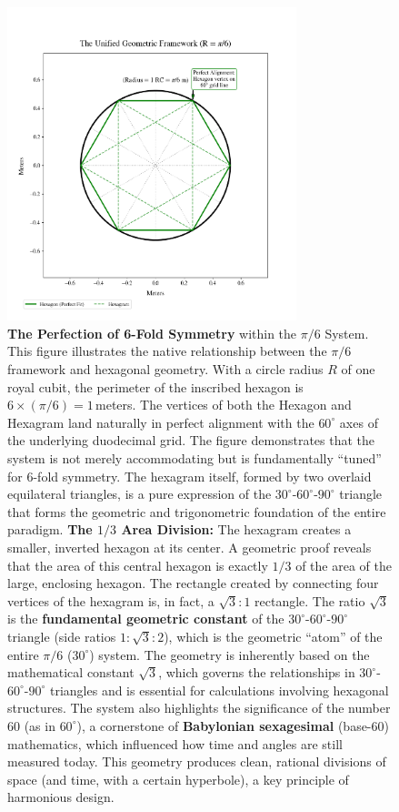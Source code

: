 \documentclass[11pt]{article}
\begin{document}
\begin{figure}[htbp]
\centering
\includegraphics[width=0.75\textwidth]{figures/hexagram-fig.png}
\caption{\textbf{The Perfection of 6-Fold Symmetry} within the $\pi/6$ System. This figure illustrates the native relationship between the $\pi/6$ framework and hexagonal geometry. With a circle radius $R$ of one royal cubit, the perimeter of the inscribed hexagon is $6 \times (\pi/6) = 1$\,meters. The vertices of both the Hexagon and Hexagram land naturally in perfect alignment with the $60^\circ$ axes of the underlying duodecimal grid. The figure demonstrates that the system is not merely accommodating but is fundamentally ``tuned'' for 6-fold symmetry. The hexagram itself, formed by two overlaid equilateral triangles, is a pure expression of the $30^\circ$-$60^\circ$-$90^\circ$ triangle that forms the geometric and trigonometric foundation of the entire paradigm. \textbf{The $1/3$ Area Division:} The hexagram creates a smaller, inverted hexagon at its center. A geometric proof reveals that the area of this central hexagon is exactly $1/3$ of the area of the large, enclosing hexagon. The rectangle created by connecting four vertices of the hexagram is, in fact, a $\sqrt{3} : 1$ rectangle. The ratio $\sqrt{3}$ is the \textbf{fundamental geometric constant} of the $30^\circ$-$60^\circ$-$90^\circ$ triangle (side ratios $1 : \sqrt{3} : 2$), which is the geometric ``atom'' of the entire $\pi/6$ ($30^\circ$) system. The geometry is inherently based on the mathematical constant $\sqrt{3}$, which governs the relationships in $30^\circ$-$60^\circ$-$90^\circ$ triangles and is essential for calculations involving hexagonal structures. The system also highlights the significance of the number 60 (as in $60^\circ$), a cornerstone of \textbf{Babylonian sexagesimal} (base-60) mathematics, which influenced how time and angles are still measured today. This geometry produces clean, rational divisions of space (and time, with a certain hyperbole), a key principle of harmonious design.}
\label{fig:hexagram_perfection}
\end{figure}
\end{document}
